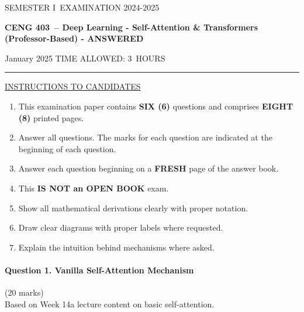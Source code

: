 \documentclass[12pt]{article}
\newcommand{\masunitnumber}{CENG 403}
\newcommand{\examdate}{January 2025}
\newcommand{\academicyear}{2024-2025}
\newcommand{\semester}{I}
\newcommand{\coursename}{Deep Learning - Self-Attention \& Transformers (Professor-Based) - ANSWERED}
\newcommand{\numberofhours}{3}
\begin{document}
\setlength{\headsep}{5truemm}
\setlength{\headheight}{14.5truemm}
\setlength{\voffset}{-0.45truein}
\renewcommand{\headrulewidth}{0.0pt}
\begin{center}
SEMESTER \semester\ EXAMINATION \academicyear
\end{center}
\begin{center}
{\bf \masunitnumber\ -- \coursename}
\end{center}
\vspace{20truemm}
\noindent \examdate\hspace{45truemm} TIME ALLOWED: \numberofhours\ HOURS
\vspace{19truemm}
\hrule
\vspace{19truemm}
\noindent\underline{INSTRUCTIONS TO CANDIDATES}
\vspace{8truemm}
\begin{enumerate}
\item This examination paper contains {\bf SIX (6)} questions and comprises 
{\bf EIGHT (8)} printed pages.
\item Answer all questions. 
The marks for each question are indicated at the beginning of each question.
\item Answer each question beginning on a {\bf FRESH} page of the answer book.
\item This {\bf IS NOT an OPEN BOOK} exam.
\item Show all mathematical derivations clearly with proper notation.
\item Draw clear diagrams with proper labels where requested.
\item Explain the intuition behind mechanisms where asked.
\end{enumerate}
\newpage
\lhead{}
\rhead{\masunitnumber}
\chead{}
\lfoot{}
\cfoot{\thepage}
\rfoot{}
\setlength{\footskip}{45pt}

\paragraph{Question 1. Vanilla Self-Attention Mechanism}\hfill (20 marks)\\
Based on Week 14a lecture content on basic self-attention.
\end{document}
